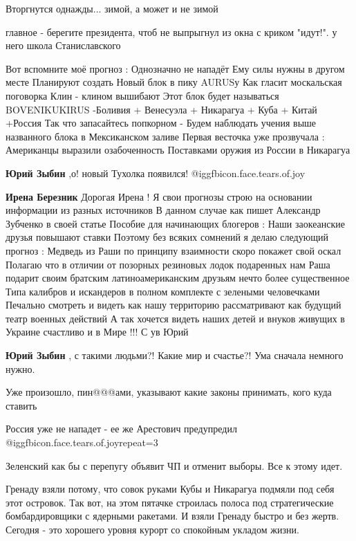 \begin{itemize}
Вторгнутся однажды... зимой, а может и не зимой

главное - берегите президента, чтоб не выпрыгнул из окна с криком "идут!". у него школа Станиславского


Вот вспомните моё прогноз : Однозначно не нападёт Ему силы нужны в другом месте
Планируют создать Новый блок в пику AURUSу Как гласит москальская поговорка
Клин - клином вышибают Этот блок будет называться BOVENIKUKIRUS -Боливия +
Венесуэла + Никарагуа + Куба + Китай +Россия Так что запасайтесь попкорном -
Будем наблюдать учения выше названного блока в Мексиканском заливе Первая
весточка уже прозвучала : Американцы выразили озабоченность Поставками оружия
из России в Никарагуа

\begin{itemize} %
\textbf{Юрий Зыбин} ,о! новый Тухолка появился! @igg{fbicon.face.tears.of.joy} 

\textbf{Ирена Березник} Дорогая Ирена ! Я свои прогнозы строю на основании информации из разных источников В данном случае как пишет Александр Зубченко в своей статье Пособие для начинающих блогеров : Наши заокеанские друзья повышают ставки Поэтому без всяких сомнений я делаю следующий прогноз : Медведь из Раши по принципу взаимности скоро покажет свой оскал Полагаю что в отличии от позорных резиновых лодок подаренных нам Раша подарит своим братским латиноамериканским друзьям нечто более существенное Типа калибров и искандеров в полном комплекте с зелеными человечками Печально смотреть и видеть как нашу территорию рассматривают как будущий театр военных действий А так хочется видеть наших детей и внуков живущих в Украине счастливо и в Мире !!! С ув Юрий

\textbf{Юрий Зыбин} , с такими людьми?! Какие мир и счастье?! Ума сначала немного нужно.
\end{itemize} %

Уже произошло, пин@@@ами, указывают какие законы принимать, кого куда ставить

Россия уже не нападет - ее же Арестович предупредил @igg{fbicon.face.tears.of.joy}{repeat=3} 

Зеленский как бы с перепугу объявит ЧП и отменит выборы. Все к этому идет.


Гренаду взяли потому, что совок руками Кубы и Никарагуа подмяли под себя этот
островок. Так вот, на этом пятачке строилась полоса под стратегические
бомбардировщики с ядерными ракетами. И взяли Гренаду быстро и без жертв.
Сегодня - это хорошего уровня курорт со спокойным укладом жизни.


\end{itemize}
